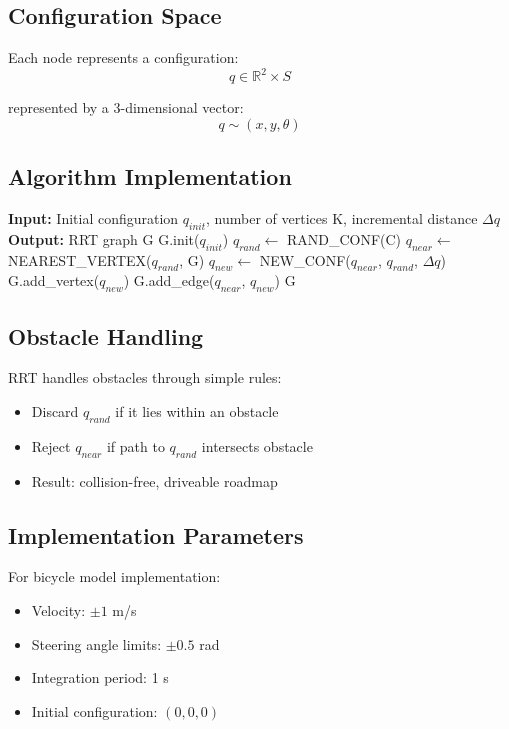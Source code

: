 \documentclass[openany]{book}
\theoremstyle{definition}
\theoremstyle{remark}
\begin{document}
\subsection{Configuration Space}
Each node represents a configuration:
\begin{equation}
q \in \mathbb{R}^2 \times S
\end{equation}

represented by a 3-dimensional vector:
\begin{equation}
q \sim (x, y, \theta)
\end{equation}

\subsection{Algorithm Implementation}
\begin{algorithmic}[1]
\State \textbf{Input:} Initial configuration $q_{init}$, number of vertices K, incremental distance $\Delta q$
\State \textbf{Output:} RRT graph G
\State G.init($q_{init}$)
   \State $q_{rand} \leftarrow$ RAND\_CONF(C)
   \State $q_{near} \leftarrow$ NEAREST\_VERTEX($q_{rand}$, G)
   \State $q_{new} \leftarrow$ NEW\_CONF($q_{near}$, $q_{rand}$, $\Delta q$)
   \State G.add\_vertex($q_{new}$)
   \State G.add\_edge($q_{near}$, $q_{new}$)
\EndFor
\State \Return G
\end{algorithmic}

\subsection{Obstacle Handling}
RRT handles obstacles through simple rules:
\begin{itemize}
   \item Discard $q_{rand}$ if it lies within an obstacle
   \item Reject $q_{near}$ if path to $q_{rand}$ intersects obstacle
   \item Result: collision-free, driveable roadmap
\end{itemize}

\subsection{Implementation Parameters}
For bicycle model implementation:
\begin{itemize}
   \item Velocity: $\pm 1$ m/s
   \item Steering angle limits: $\pm 0.5$ rad
   \item Integration period: 1 s
   \item Initial configuration: $(0,0,0)$
\end{itemize}
\end{document}
